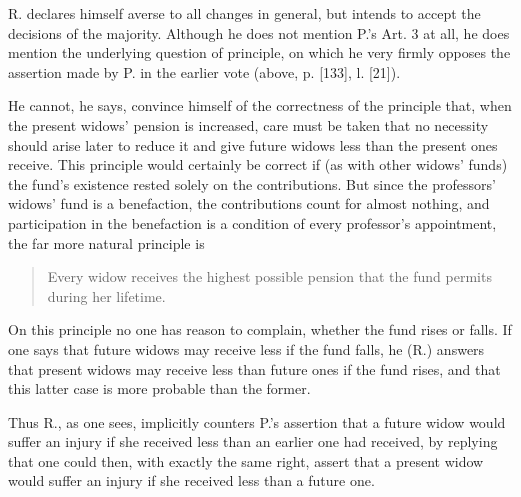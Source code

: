 R. declares himself averse to all changes in general, but intends to accept the decisions of the majority. Although he does not mention P.'s Art. 3 at all, he does mention the underlying question of principle, on which he very firmly opposes the assertion made by P. in the earlier vote (above, p. [133], l. [21]).

He cannot, he says, convince himself of the correctness of the principle that, when the present widows' pension is increased, care must be taken that no necessity should arise later to reduce it and give future widows less than the present ones receive. This principle would certainly be correct if (as with other widows' funds) the fund's existence rested solely on the contributions. But since the professors' widows' fund is a benefaction, the contributions count for almost nothing, and participation in the benefaction is a condition of every professor's appointment, the far more natural principle is
\begin{quote}
Every widow receives the highest possible pension that the fund permits during her lifetime.
\end{quote}
\par{}
On this principle no one has reason to complain, whether the fund rises or falls. If one says that future widows may receive less if the fund falls, he (R.) answers that present widows may receive less than future ones if the fund rises, and that this latter case is more probable than the former.

Thus R., as one sees, implicitly counters P.'s assertion that a future widow would suffer an injury if she received less than an earlier one had received, by replying that one could then, with exactly the same right, assert that a present widow would suffer an injury if she received less than a future one.

